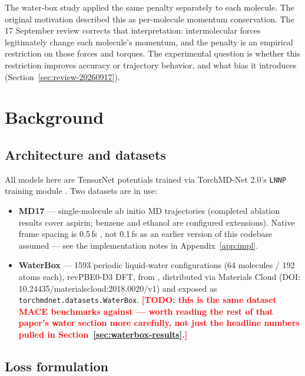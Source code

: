 \documentclass[11pt]{article}
\newcommand{\todo}[1]{\textcolor{red}{\textbf{[TODO: #1]}}}
\begin{document}
The water-box study applied the same penalty separately to each molecule.
The original motivation described this as per-molecule momentum
conservation. The 17 September review corrects that interpretation:
intermolecular forces legitimately change each molecule's momentum, and
the penalty is an empirical restriction on those forces and torques.
The experimental question is whether this restriction improves accuracy
or trajectory behavior, and what bias it introduces
(Section~\ref{sec:review-20260917}).

\section{Background}
\label{sec:background}

\subsection{Architecture and datasets}

All models here are TensorNet \cite{tensornet} potentials trained via
TorchMD-Net 2.0's \texttt{LNNP} training module \cite{torchmdnet2}. Two
datasets are in use:

\begin{itemize}
  \item \textbf{MD17} \cite{md17} --- single-molecule ab initio MD
  trajectories (completed ablation results cover aspirin; benzene and
  ethanol are configured extensions). Native frame spacing
  is 0.5\,fs \cite{md17}, not 0.1\,fs as an earlier version of this codebase
  assumed --- see the implementation notes in Appendix~\ref{app:impl}.
  \item \textbf{WaterBox} \cite{cheng2019water} --- 1593 periodic liquid-water
  configurations (64 molecules / 192 atoms each), revPBE0-D3 DFT, from
  \citet{cheng2019water}, distributed via Materials Cloud
  (DOI: 10.24435/materialscloud:2018.0020/v1) and exposed as
  \texttt{torchmdnet.datasets.WaterBox}. \todo{this is the same dataset MACE
  \cite{mace} benchmarks against --- worth reading the rest of that paper's
  water section more carefully, not just the headline numbers pulled in
  Section~\ref{sec:waterbox-results}.}
\end{itemize}

\subsection{Loss formulation}
\label{sec:loss-formulation}
\end{document}
